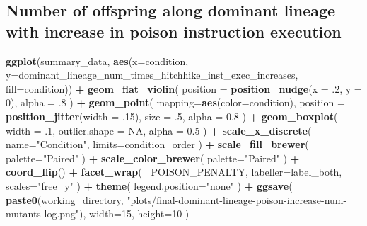 \documentclass[]{book}
\newenvironment{Shaded}{\begin{snugshade}}{\end{snugshade}}
\newcommand{\DataTypeTok}[1]{\textcolor[rgb]{0.13,0.29,0.53}{#1}}
\newcommand{\DecValTok}[1]{\textcolor[rgb]{0.00,0.00,0.81}{#1}}
\newcommand{\FloatTok}[1]{\textcolor[rgb]{0.00,0.00,0.81}{#1}}
\newcommand{\KeywordTok}[1]{\textcolor[rgb]{0.13,0.29,0.53}{\textbf{#1}}}
\newcommand{\NormalTok}[1]{#1}
\newcommand{\OperatorTok}[1]{\textcolor[rgb]{0.81,0.36,0.00}{\textbf{#1}}}
\newcommand{\OtherTok}[1]{\textcolor[rgb]{0.56,0.35,0.01}{#1}}
\newcommand{\StringTok}[1]{\textcolor[rgb]{0.31,0.60,0.02}{#1}}
\begin{document}
\hypertarget{number-of-offspring-along-dominant-lineage-with-increase-in-poison-instruction-execution}{%
\subsection{Number of offspring along dominant lineage with increase in poison instruction execution}\label{number-of-offspring-along-dominant-lineage-with-increase-in-poison-instruction-execution}}

\begin{Shaded}
\begin{Highlighting}[]
\KeywordTok{ggplot}\NormalTok{(summary_data, }\KeywordTok{aes}\NormalTok{(}\DataTypeTok{x=}\NormalTok{condition, }\DataTypeTok{y=}\NormalTok{dominant_lineage_num_times_hitchhike_inst_exec_increases, }\DataTypeTok{fill=}\NormalTok{condition)) }\OperatorTok{+}
\StringTok{  }\KeywordTok{geom_flat_violin}\NormalTok{(}
    \DataTypeTok{position =} \KeywordTok{position_nudge}\NormalTok{(}\DataTypeTok{x =} \FloatTok{.2}\NormalTok{, }\DataTypeTok{y =} \DecValTok{0}\NormalTok{),}
    \DataTypeTok{alpha =} \FloatTok{.8}
\NormalTok{  ) }\OperatorTok{+}
\StringTok{  }\KeywordTok{geom_point}\NormalTok{(}
    \DataTypeTok{mapping=}\KeywordTok{aes}\NormalTok{(}\DataTypeTok{color=}\NormalTok{condition),}
    \DataTypeTok{position =} \KeywordTok{position_jitter}\NormalTok{(}\DataTypeTok{width =} \FloatTok{.15}\NormalTok{),}
    \DataTypeTok{size =} \FloatTok{.5}\NormalTok{,}
    \DataTypeTok{alpha =} \FloatTok{0.8}
\NormalTok{  ) }\OperatorTok{+}
\StringTok{  }\KeywordTok{geom_boxplot}\NormalTok{(}
    \DataTypeTok{width =} \FloatTok{.1}\NormalTok{,}
    \DataTypeTok{outlier.shape =} \OtherTok{NA}\NormalTok{,}
    \DataTypeTok{alpha =} \FloatTok{0.5}
\NormalTok{  ) }\OperatorTok{+}
\StringTok{  }\KeywordTok{scale_x_discrete}\NormalTok{(}
    \DataTypeTok{name=}\StringTok{"Condition"}\NormalTok{,}
    \DataTypeTok{limits=}\NormalTok{condition_order}
\NormalTok{  ) }\OperatorTok{+}
\StringTok{  }\KeywordTok{scale_fill_brewer}\NormalTok{(}
    \DataTypeTok{palette=}\StringTok{"Paired"}
\NormalTok{  ) }\OperatorTok{+}
\StringTok{  }\KeywordTok{scale_color_brewer}\NormalTok{(}
    \DataTypeTok{palette=}\StringTok{"Paired"}
\NormalTok{  ) }\OperatorTok{+}
\StringTok{  }\KeywordTok{coord_flip}\NormalTok{() }\OperatorTok{+}
\StringTok{  }\KeywordTok{facet_wrap}\NormalTok{(}
    \OperatorTok{~}\NormalTok{POISON_PENALTY,}
    \DataTypeTok{labeller=}\NormalTok{label_both,}
    \DataTypeTok{scales=}\StringTok{"free_y"}
\NormalTok{  ) }\OperatorTok{+}
\StringTok{  }\KeywordTok{theme}\NormalTok{(}
    \DataTypeTok{legend.position=}\StringTok{"none"}
\NormalTok{  ) }\OperatorTok{+}
\StringTok{  }\KeywordTok{ggsave}\NormalTok{(}
    \KeywordTok{paste0}\NormalTok{(working_directory, }\StringTok{"plots/final-dominant-lineage-poison-increase-num-mutants-log.png"}\NormalTok{),}
    \DataTypeTok{width=}\DecValTok{15}\NormalTok{,}
    \DataTypeTok{height=}\DecValTok{10}
\NormalTok{  )}
\end{Highlighting}
\end{Shaded}
\end{document}
